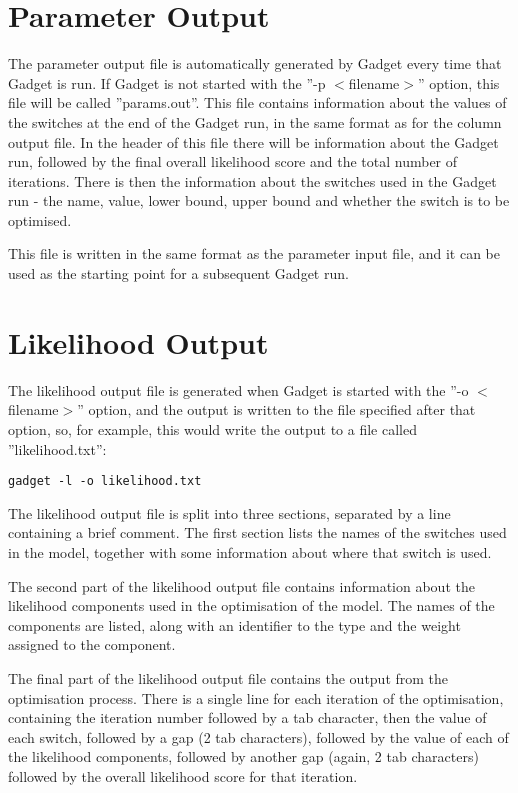 \documentclass[10pt,twoside]{book}
\begin{document}
\section{Parameter Output}\label{sec:paramoutput}
The parameter output file is automatically generated by Gadget every time that Gadget is run.  If Gadget is not started with the ''-p $<$filename$>$'' option, this file will be called ''params.out''.  This file contains information about the values of the switches at the end of the Gadget run, in the same format as for the column output file.  In the header of this file there will be information about the Gadget run, followed by the final overall likelihood score and the total number of iterations.  There is then the information about the switches used in the Gadget run - the name, value, lower bound, upper bound and whether the switch is to be optimised.

\bigskip
This file is written in the same format as the parameter input file, and it can be used as the starting point for a subsequent Gadget run.

\section{Likelihood Output}\label{sec:likelihoodoutput}
The likelihood output file is generated when Gadget is started with the ''-o $<$filename$>$'' option, and the output is written to the file specified after that option, so, for example, this would write the output to a file called ''likelihood.txt'':

{\small\begin{verbatim}
gadget -l -o likelihood.txt
\end{verbatim}}

The likelihood output file is split into three sections, separated by a line containing a brief comment.  The first section lists the names of the switches used in the model, together with some information about where that switch is used.

\bigskip
The second part of the likelihood output file contains information about the likelihood components used in the optimisation of the model.  The names of the components are listed, along with an identifier to the type and the weight assigned to the component.

\bigskip
The final part of the likelihood output file contains the output from the optimisation process.  There is a single line for each iteration of the optimisation, containing the iteration number followed by a tab character, then the value of each switch, followed by a gap (2 tab characters), followed by the value of each of the likelihood components, followed by another gap (again, 2 tab characters) followed by the overall likelihood score for that iteration.
\end{document}
